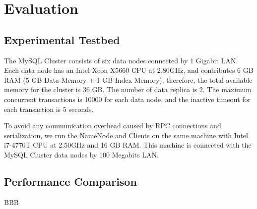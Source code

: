 
%
%


\chapter{Evaluation}
\label{ch:evaluation}

%




\section{Experimental Testbed}
\label{sec:testbed}

The MySQL Cluster consists of six data nodes connected by 1 Gigabit LAN. Each data node has an Intel Xeon X5660 CPU at 2.80GHz, and contributes 6 GB RAM (5 GB Data Memory + 1 GB Index Memory), therefore, the total available memory for the cluster is 36 GB. The number of data replica is 2. The maximum concurrent transactions is 10000 for each data node, and the inactive timeout for each transaction is 5 seconds. 

\noindent To avoid any communication overhead caused by RPC connections and serialization, we run the NameNode and Clients on the same machine with Intel i7-4770T CPU at 2.50GHz and 16 GB RAM. This machine is connected with the MySQL Cluster data nodes by 100 Megabits LAN.


\section{Performance Comparison}

BBB

